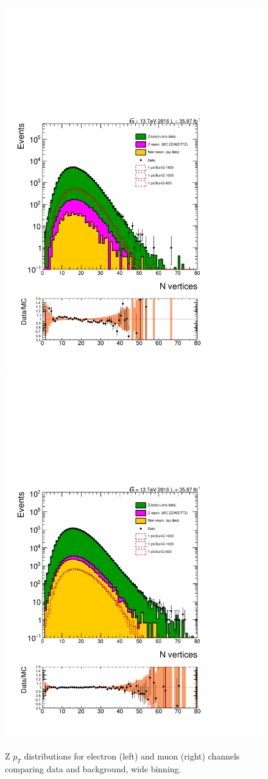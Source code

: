 \begin{figure}[htbp!]
\centering
\includegraphics[width=0.46\linewidth,page=9]{figures/ReMiniSummer16_DT_PhReMiniMCRcFixXsec_GMCPhPtWt_tightzpt50_puWeightsummer16_muoneg_gjet_metfilter_unblind_el_log_1pb.pdf}
\includegraphics[width=0.46\linewidth,page=9]{figures/ReMiniSummer16_DT_PhReMiniMCRcFixXsec_GMCPhPtWt_tightzpt50_puWeightsummer16_muoneg_gjet_metfilter_unblind_mu_log_1pb.pdf}
\caption{Z $p_T$ distributions for electron (left) and muon (right) channels
comparing data and background,
wide binning.}
\label{fig:gjet_zpt_wide}
\end{figure}

